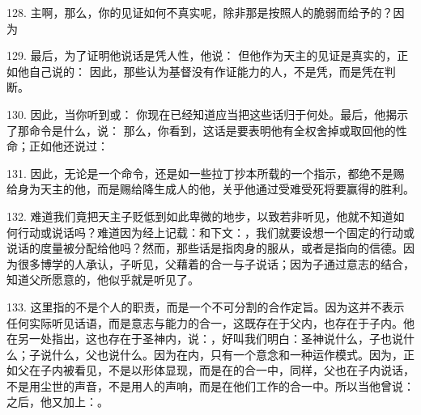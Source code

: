 128. 主啊，那么，你的见证如何不真实呢，除非那是按照人的脆弱而给予的？因为\par

129. 最后，为了证明他说话是凭人性，他说： 但他作为天主的见证是真实的，正如他自己说的： 因此，那些认为基督没有作证能力的人，不是凭，而是凭在判断。\par

130. 因此，当你听到或： 你现在已经知道应当把这些话归于何处。最后，他揭示了那命令是什么，说： 那么，你看到，这话是要表明他有全权舍掉或取回他的性命；正如他还说过：\par

131. 因此，无论是一个命令，还是如一些拉丁抄本所载的一个指示，都绝不是赐给身为天主的他，而是赐给降生成人的他，关乎他通过受难受死将要赢得的胜利。\par

\par

132. 难道我们竟把天主子贬低到如此卑微的地步，以致若非听见，他就不知道如何行动或说话吗？难道因为经上记载：和下文：，我们就要设想一个固定的行动或说话的度量被分配给他吗？然而，那些话是指肉身的服从，或者是指向的信德。因为很多博学的人承认，子听见，父藉着的合一与子说话；因为子通过意志的结合，知道父所愿意的，他似乎就是听见了。\par

133. 这里指的不是个人的职责，而是一个不可分割的合作定旨。因为这并不表示任何实际听见话语，而是意志与能力的合一，这既存在于父内，也存在于子内。他在另一处指出，这也存在于圣神内，说：，好叫我们明白：圣神说什么，子也说什么；子说什么，父也说什么。因为在内，只有一个意念和一种运作模式。因为，正如父在子内被看见，不是以形体显现，而是在的合一中，同样，父也在子内说话，不是用尘世的声音，不是用人的声响，而是在他们工作的合一中。所以当他曾说： 之后，他又加上：。\par

